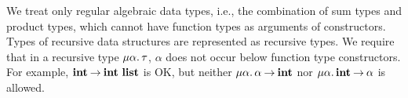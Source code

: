 We treat only regular algebraic data types, i.e., the combination of sum
types and product types, which cannot have function types as arguments
of constructors.  Types of recursive data structures are represented as
recursive types.  We require that in a recursive type
$\mu{\alpha}.\, {\tau}$, $\alpha$ does not occur below function type
constructors. For example, ${{\mathbf{int}}\mathbin{\rightarrow}{\mathbf{int}}}\ \mathbf{list}$ is OK, but neither
$\mu{\alpha}.\, {{\alpha}\mathbin{\rightarrow}{\mathbf{int}}}$ nor
$\mu{\alpha}.\, {{\mathbf{int}}\mathbin{\rightarrow}{\alpha}}$ is allowed.


%
%
%
%
